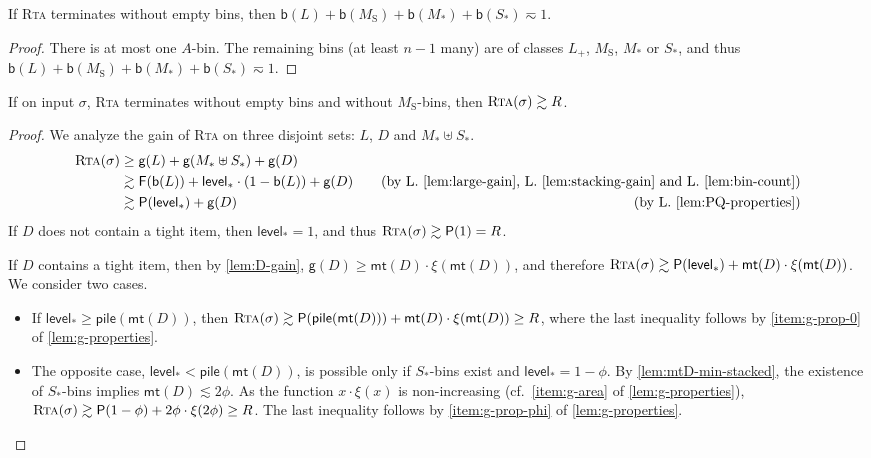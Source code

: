\documentclass[a4paper,USenglish,cleveref]{lipics-v2019}
\newcommand{\R}{\ensuremath{R}}
\newcommand{\LG}{\ensuremath{L}\xspace}
\newcommand{\M}{\ensuremath{M_\mathrm{S}}\xspace}
\newcommand{\A}{\ensuremath{A}\xspace}
\newcommand{\ST}{\ensuremath{S_*}\xspace}
\newcommand{\MT}{\ensuremath{M_*}\xspace}
\newcommand{\LT}{\ensuremath{L_+}\xspace}
\newcommand{\D}{\ensuremath{D}\xspace}
\newcommand{\smallBoundary}{\ensuremath{\phi}}
\newcommand{\g}{\ensuremath{\xi}}
\newcommand{\fintegral}{\textsf{F}}
\newcommand{\cutintegral}{\textsf{P}}
\newcommand{\B}{\textsf{b}}
\newcommand{\gain}{\textsf{g}}
\newcommand{\stack}{\textsf{pile}}
\newcommand{\level}{\textsf{level}_*}
\newcommand{\mt}{\textsf{mt}(\D)}
\newcommand{\ALG}{\textsc{Rta}\xspace}
\begin{document}
\begin{lemma}
\label{lem:bin-count}
If \ALG terminates without empty bins, then $\B(\LG) + \B(\M) + \B(\MT) + \B(\ST) \eqsim 1$. 
\end{lemma}

\begin{proof}
There is at most one \A-bin.
The remaining bins (at least $n-1$ many) are of classes \LT, \M, $\MT$ or \ST,
and thus $\B(\LG) + \B(\M) + \B(\MT) + \B(\ST) \eqsim 1$. 
\end{proof}

\begin{lemma}
\label{lem:no-m-bin}
If on input $\sigma$, \ALG terminates without empty bins and without \M-bins, then $\ALG(\sigma) \gtrsim \R$.
\end{lemma}

\begin{proof}
We analyze the gain of \ALG on three disjoint sets: $\LG$, $D$ and $\MT \uplus \ST$.
\begin{align*}
  \ALG(\sigma)
  & \geq \gain(\LG) + \gain(\MT \uplus \ST) + \gain(\D) \\
  & \gtrsim \fintegral(\B(\LG)) + \level \cdot (1-\B(\LG)) + \gain(\D)
    &&& \text{(by L.~\ref{lem:large-gain}, L.~\ref{lem:stacking-gain}
      and L.~\ref{lem:bin-count})} \\
  & \gtrsim \cutintegral(\level) + \gain(\D) 
  &&& \text{(by L.~\ref{lem:PQ-properties})}
  \end{align*}
If $\D$ does not contain a tight item, then $\level = 1$,
and thus $\ALG(\sigma) \gtrsim \cutintegral(1) = \R$.

If $\D$ contains a tight item, then 
by \cref{lem:D-gain}, $\gain(\D) \geq \mt \cdot \g(\mt)$, and therefore
$\ALG(\sigma) \gtrsim \cutintegral(\level) + \mt \cdot \g(\mt)$.
We consider two cases.
\begin{itemize}
\item If $\level \geq \stack(\mt)$, 
then $\ALG(\sigma) \gtrsim \cutintegral(\stack(\mt)) + \mt \cdot \g(\mt) \geq \R$,
where the last inequality follows by \cref{item:g-prop-0} of \cref{lem:g-properties}.

\item 
The opposite case, $\level < \stack(\mt)$, is possible only if $\ST$-bins exist
and $\level = 1-\smallBoundary$. By \cref{lem:mtD-min-stacked}, the existence of
$\ST$-bins implies $\mt \lesssim 2 \smallBoundary$. As the function $x \cdot
\g(x)$ is non-increasing (cf.~\cref{item:g-area} of \cref{lem:g-properties}),
$\ALG(\sigma) \gtrsim \cutintegral(1-\smallBoundary) + 2 \smallBoundary \cdot
\g(2 \smallBoundary) \geq R$. The last inequality follows by
\cref{item:g-prop-phi} of \cref{lem:g-properties}.
\qedhere
\end{itemize}
\end{proof}
\end{document}
